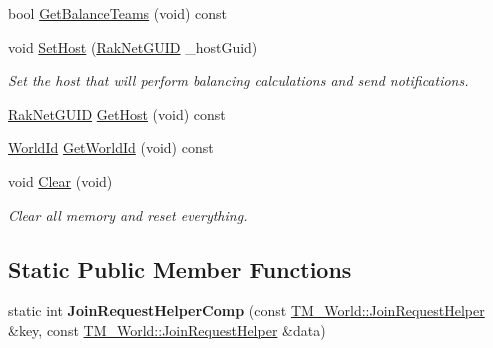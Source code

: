 \begin{DoxyCompactItemize}
bool \hyperlink{class_rak_net_1_1_t_m___world_a3084f7e97c4282d6656dd9ce63bb334a}{Get\-Balance\-Teams} (void) const 
\item 
void \hyperlink{class_rak_net_1_1_t_m___world_a8de7c1244f4b38d2ad612c3c98d614ca}{Set\-Host} (\hyperlink{struct_rak_net_1_1_rak_net_g_u_i_d}{Rak\-Net\-G\-U\-I\-D} \-\_\-host\-Guid)
\begin{DoxyCompactList}\small\item\em Set the host that will perform balancing calculations and send notifications. \end{DoxyCompactList}\item 
\hyperlink{struct_rak_net_1_1_rak_net_g_u_i_d}{Rak\-Net\-G\-U\-I\-D} \hyperlink{class_rak_net_1_1_t_m___world_a89c3bf192788644eb502c7fa68c4b481}{Get\-Host} (void) const 
\item 
\hyperlink{group___r_e_p_l_i_c_a___m_a_n_a_g_e_r___g_r_o_u_p3_ga44b59af8e882248f61aa41d8ace38bf7}{World\-Id} \hyperlink{class_rak_net_1_1_t_m___world_a973b1f63787919a8baf3fa890f821d89}{Get\-World\-Id} (void) const 
\item 
void \hyperlink{class_rak_net_1_1_t_m___world_affc5857f6a15ce211e8bd892394c23f5}{Clear} (void)
\begin{DoxyCompactList}\small\item\em Clear all memory and reset everything. \end{DoxyCompactList}\end{DoxyCompactItemize}
\subsection*{Static Public Member Functions}
\begin{DoxyCompactItemize}
\item 
\hypertarget{class_rak_net_1_1_t_m___world_a351d55eb3fb1971ca000772efa78d431}{static int {\bfseries Join\-Request\-Helper\-Comp} (const \hyperlink{struct_rak_net_1_1_t_m___world_1_1_join_request_helper}{T\-M\-\_\-\-World\-::\-Join\-Request\-Helper} \&key, const \hyperlink{struct_rak_net_1_1_t_m___world_1_1_join_request_helper}{T\-M\-\_\-\-World\-::\-Join\-Request\-Helper} \&data)}\label{class_rak_net_1_1_t_m___world_a351d55eb3fb1971ca000772efa78d431}

\end{DoxyCompactItemize}
